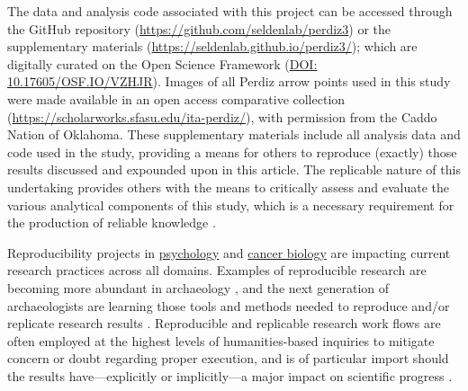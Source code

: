 \documentclass[smallextended]{svjour3}       %
\begin{document}
The data and analysis code associated with this project can be accessed
through the GitHub repository
(\url{https://github.com/seldenlab/perdiz3}) or the supplementary
materials (\url{https://seldenlab.github.io/perdiz3/}); which are
digitally curated on the Open Science Framework \newline 
(\href{https://osf.io/vzhjr/}{DOI: 10.17605/OSF.IO/VZHJR}). Images of
all Perdiz arrow points used in this study were made available in an
open access comparative collection
(\url{https://scholarworks.sfasu.edu/ita-perdiz/}), with permission from
the Caddo Nation of Oklahoma. These supplementary materials include all
analysis data and code used in the study, providing a means for others
to reproduce (exactly) those results discussed and expounded upon in
this article. The replicable nature of this undertaking provides others
with the means to critically assess and evaluate the various analytical
components of this study, which is a necessary requirement for the
production of reliable knowledge \cite{RN20915,RN20916,RN20917}.

Reproducibility projects in \href{https://osf.io/ezcuj/}{psychology} and
\href{https://www.cos.io/rpcb}{cancer biology} are impacting current
research practices across all domains. Examples of reproducible research
are becoming more abundant in archaeology
\cite{RN20804,RN21009,RN8322,RN9364,RN11097}, and the next generation of
archaeologists are learning those tools and methods needed to reproduce
and/or replicate research results \cite{RN21007}. Reproducible and
replicable research work flows are often employed at the highest levels
of humanities-based inquiries to mitigate concern or doubt regarding
proper execution, and is of particular import should the results
have---explicitly or implicitly---a major impact on scientific progress
\cite{RN21008}.




\end{document}
